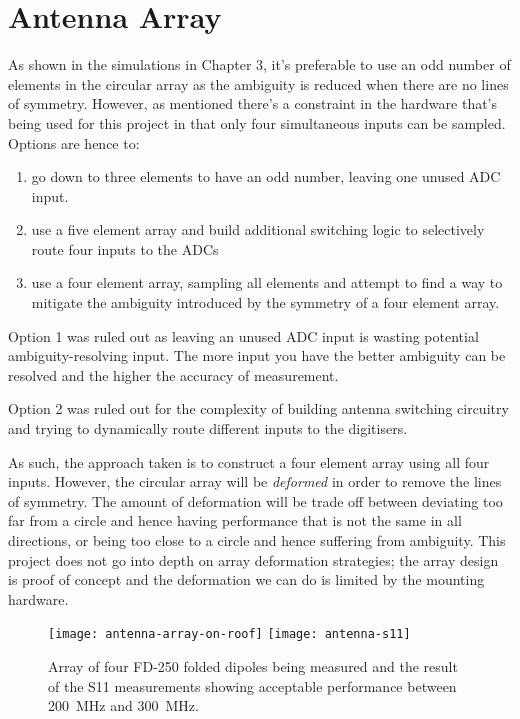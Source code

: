 \section{Antenna Array}

As shown in the simulations in Chapter 3, it's preferable to use an odd number of elements in the circular array as the ambiguity is reduced when there are no lines of symmetry. However, as mentioned there's a constraint in the hardware that's being used for this project in that only four simultaneous inputs can be sampled. Options are hence to:
\begin{enumerate}
  \item go down to three elements to have an odd number, leaving one unused ADC input.
  \item use a five element array and build additional switching logic to selectively route four inputs to the ADCs
  \item use a four element array, sampling all elements and attempt to find a way to mitigate the ambiguity introduced by the symmetry of a four element array.
\end{enumerate}
    
Option 1 was ruled out as leaving an unused ADC input is wasting potential ambiguity-resolving input. The more input you have the better ambiguity can be resolved and the higher the accuracy of measurement. 

Option 2 was ruled out for the complexity of building antenna switching circuitry and trying to dynamically route different inputs to the digitisers. 

As such, the approach taken is to construct a four element array using all four inputs. However, the circular array will be \emph{deformed} in order to remove the lines of symmetry. The amount of deformation will be trade off between deviating too far from a circle and hence having performance that is not the same in all directions, or being too close to a circle and hence suffering from ambiguity. This project does not go into depth on array deformation strategies; the array design is proof of concept and the deformation we can do is limited by the mounting hardware.\\

\begin{figure}
  \centering
  \texttt{[image: antenna-array-on-roof]}
  \texttt{[image: antenna-s11]}
  \caption{Array of four FD-250 folded dipoles being measured and the result of the S11 measurements showing acceptable performance between \SI{200}{\mega\hertz} and \SI{300}{\mega\hertz}.}
  \label{fig:rf-front-end:antenna-array-s11}
\end{figure}

